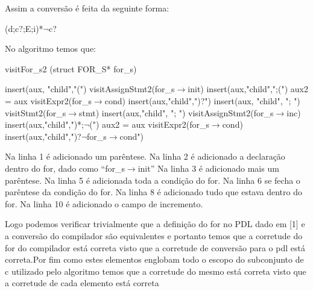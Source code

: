 \documentclass{article}
\begin{document}
		Assim a conversão é feita da seguinte forma:
			
		(d;c?;E;i)*$\neg$c?
		
		No algoritmo temos que:
		
		\begin{algorithm}
			\caption{visitFor\_s2 (struct FOR\_S* for\_s)}
			insert(aux, "child","(")\;
			visitAssignStmt2(for\_s$\rightarrow$init)\;
			insert(aux,"child",";(")\;
			aux2 = aux\;
			visitExpr2(for\_s$\rightarrow$cond)\;
			insert(aux,"child",")?")\;
			insert(aux, "child", "; ")\;
			visitStmt2(for\_s$\rightarrow$stmt)\;
			insert(aux,"child", "; ")\;
			visitAssignStmt2(for\_s$\rightarrow$inc)\;
			insert(aux,"child",")*;$\neg$(")\;
			aux2 = aux\;
			visitExpr2(for\_s$\rightarrow$cond)\;
			insert(aux,"child",")?$\neg$for\_s$\rightarrow$cond")\;
		\end{algorithm}
	
		Na linha 1 é adicionado um parêntese.
		Na linha 2 é adicionado a declaração dentro do for, dado como “for\_s$\rightarrow$init”
		Na linha 3 é adicionado mais um parêntese.
		Na linha 5 é adicionada toda a condição do for.
		Na linha 6 se fecha o parêntese da condição do for.
		Na linha 8 é adicionado tudo que estava dentro do for.
		Na linha 10 é adicionado o campo de incremento.
		
		
		Logo podemos verificar trivialmente que a definição do for no PDL dado em [1] e a conversão do compilador são equivalentes e portanto temos que a corretude do for do compilador está correta visto que a corretude de conversão para o pdl está correta.Por fim como estes elementos englobam todo o escopo do subconjunto de c utilizado pelo algoritmo temos que a corretude do mesmo está correta visto que a corretude de cada elemento está correta
		
		
		
\end{document}
